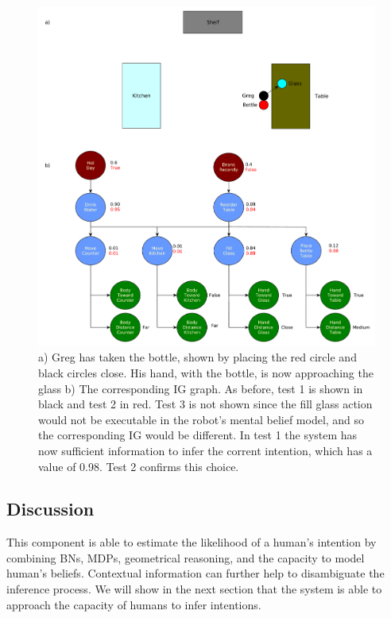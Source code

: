 \clearpage
 \begin{figure}[ht!]
	\centering
	\includegraphics[scale=0.4]{img/situation_assessment/ig_exp3.pdf}
	\caption[IG Example 3]{a) Greg has taken the bottle, shown by placing the red circle and black circles close. His hand, with the bottle, is now approaching the glass b) The corresponding IG graph. As before, test 1 is shown in black and test 2 in red. Test 3 is not shown since the fill glass action would not be executable in the robot's mental belief model, and so the corresponding IG would be different. In test 1 the system has now sufficient information to infer the corrent intention, which has a value of 0.98. Test 2 confirms this choice.}
	\label{fig:situation_assessment-ig_exp3}
\end{figure}
\clearpage

\subsection{Discussion}

This component is able to estimate the likelihood of a human's intention by combining BNs, MDPs, geometrical reasoning, and the capacity to model human's beliefs. Contextual information can further help to disambiguate the inference process. We will show in the next section that the system is able to approach the capacity of humans to infer intentions. 

